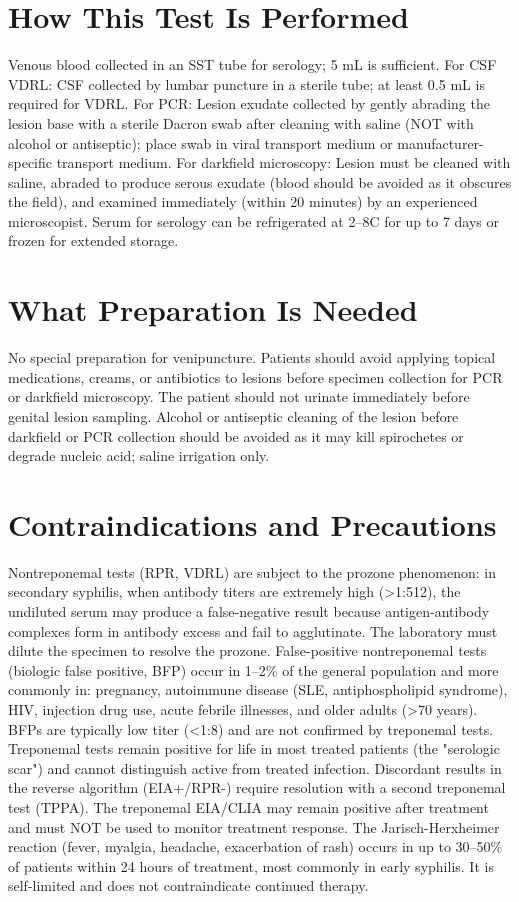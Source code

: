 \section*{How This Test Is Performed}
Venous blood collected in an SST tube for serology; 5 mL is sufficient. For CSF VDRL: CSF collected by lumbar puncture in a sterile tube; at least 0.5 mL is required for VDRL. For PCR: Lesion exudate collected by gently abrading the lesion base with a sterile Dacron swab after cleaning with saline (NOT with alcohol or antiseptic); place swab in viral transport medium or manufacturer-specific transport medium. For darkfield microscopy: Lesion must be cleaned with saline, abraded to produce serous exudate (blood should be avoided as it obscures the field), and examined immediately (within 20 minutes) by an experienced microscopist. Serum for serology can be refrigerated at 2--8\textdegree{}C for up to 7 days or frozen for extended storage.

\section*{What Preparation Is Needed}
No special preparation for venipuncture. Patients should avoid applying topical medications, creams, or antibiotics to lesions before specimen collection for PCR or darkfield microscopy. The patient should not urinate immediately before genital lesion sampling. Alcohol or antiseptic cleaning of the lesion before darkfield or PCR collection should be avoided as it may kill spirochetes or degrade nucleic acid; saline irrigation only.

\section*{Contraindications and Precautions}
Nontreponemal tests (RPR, VDRL) are subject to the prozone phenomenon: in secondary syphilis, when antibody titers are extremely high (>1:512), the undiluted serum may produce a false-negative result because antigen-antibody complexes form in antibody excess and fail to agglutinate. The laboratory must dilute the specimen to resolve the prozone. False-positive nontreponemal tests (biologic false positive, BFP) occur in 1--2\% of the general population and more commonly in: pregnancy, autoimmune disease (SLE, antiphospholipid syndrome), HIV, injection drug use, acute febrile illnesses, and older adults (>70 years). BFPs are typically low titer (<1:8) and are not confirmed by treponemal tests. Treponemal tests remain positive for life in most treated patients (the "serologic scar") and cannot distinguish active from treated infection. Discordant results in the reverse algorithm (EIA+/RPR-) require resolution with a second treponemal test (TPPA). The treponemal EIA/CLIA may remain positive after treatment and must NOT be used to monitor treatment response. The Jarisch-Herxheimer reaction (fever, myalgia, headache, exacerbation of rash) occurs in up to 30--50\% of patients within 24 hours of treatment, most commonly in early syphilis. It is self-limited and does not contraindicate continued therapy.

